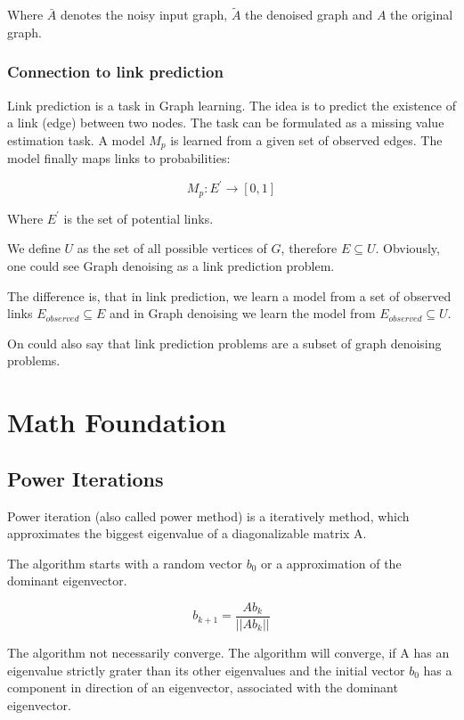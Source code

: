 Where $\bar{A}$ denotes the noisy input graph, $\tilde{A}$ the denoised
 graph and $A$ the original graph.


\subsubsection{Connection to link prediction}
Link prediction is a task in Graph learning. 
The idea is to predict the existence of a link (edge) between two nodes.
The task can be formulated as a missing value estimation task. A model $M_p$ is learned
from a given set of observed edges. The model finally maps links to probabilities:


\begin{equation}
    M_p : E^{\prime} \rightarrow [0,1]
\end{equation}

Where $E^{\prime}$ is the set of potential links.


We define $U$ as the set of all possible vertices of $G$, therefore $E \subseteq U$.
Obviously, one could see Graph denoising as a link prediction problem.

The difference is, that in link prediction, we learn a model from a set of observed links 
$E_{observed} \subseteq E$ and in Graph denoising we learn the model from 
$E_{observed} \subseteq U$. 

On could also say that link prediction problems are a subset of graph denoising problems.



\section{Math Foundation}


\subsection{Power Iterations}
\label{sec:powerIterations}

Power iteration (also called power method) is a iteratively method, 
which approximates the biggest eigenvalue of a diagonalizable matrix A.

The algorithm starts with a random vector $b_0$ or a approximation of the dominant eigenvector.

\begin{equation}
    b_{k+1} = \frac{Ab_k}{||Ab_k||}
\end{equation}

The algorithm not necessarily converge. The algorithm will converge, if A has an eigenvalue strictly grater than its other eigenvalues
and the initial vector $b_0$ has a component in direction of an eigenvector, associated with the dominant eigenvector.

